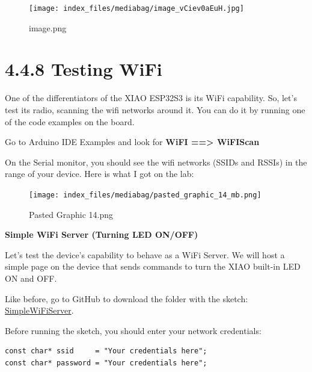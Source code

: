 \documentclass[
  letterpaper,
  DIV=11,
  numbers=noendperiod]{scrreprt}
\begin{document}
\begin{figure}[H]

{\centering \texttt{[image: index\_files/mediabag/image\_vCiev0aEuH.jpg]}

}

\caption{image.png}

\end{figure}

\hypertarget{testing-wifi-1}{%
\section*{4.4.8 Testing WiFi}\label{testing-wifi-1}}


One of the differentiators of the XIAO ESP32S3 is its WiFi capability.
So, let's test its radio, scanning the wifi networks around it. You can
do it by running one of the code examples on the board.

Go to Arduino IDE Examples and look for \textbf{WiFI ==\textgreater{}
WiFIScan}

On the Serial monitor, you should see the wifi networks (SSIDs and
RSSIs) in the range of your device. Here is what I got on the lab:

\begin{figure}[H]

{\centering \texttt{[image: index\_files/mediabag/pasted\_graphic\_14\_mb.png]}

}

\caption{Pasted Graphic 14.png}

\end{figure}

\textbf{Simple WiFi Server (Turning LED ON/OFF)}

Let's test the device's capability to behave as a WiFi Server. We will
host a simple page on the device that sends commands to turn the XIAO
built-in LED ON and OFF.

Like before, go to GitHub to download the folder with the sketch:
\href{https://github.com/Mjrovai/XIAO-ESP32S3-Sense/tree/main/SimpleWiFiServer}{SimpleWiFiServer}.

Before running the sketch, you should enter your network credentials:

\begin{verbatim}
const char* ssid     = "Your credentials here";
const char* password = "Your credentials here";
\end{verbatim}
\end{document}
